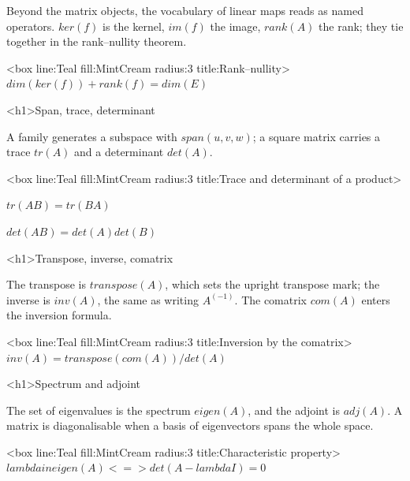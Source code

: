 \documentclass[
  margins=18,
  font=Latin Modern Roman,
  size=12,
  linespread=1.4,
  lang=en
]{scholatex}
\begin{document}
Beyond the matrix objects, the vocabulary of linear maps reads as named
operators. $ker(f)$ is the kernel, $im(f)$ the image, $rank(A)$ the rank;
they tie together in the rank–nullity theorem.

<box line:Teal fill:MintCream radius:3 title:{Rank–nullity}>{
	$dim(ker(f)) + rank(f) = dim(E)$
}

<h1>Span, trace, determinant

A family generates a subspace with $span(u, v, w)$; a square matrix carries
a trace $tr(A)$ and a determinant $det(A)$.

<box line:Teal fill:MintCream radius:3 title:{Trace and determinant of a product}>{
	$tr(A B) = tr(B A)$

	$det(A B) = det(A) det(B)$
}

<h1>Transpose, inverse, comatrix

The transpose is $transpose(A)$, which sets the upright transpose mark; the
inverse is $inv(A)$, the same as writing $A^(-1)$. The comatrix $com(A)$
enters the inversion formula.

<box line:Teal fill:MintCream radius:3 title:{Inversion by the comatrix}>{
	$inv(A) = transpose(com(A)) / det(A)$
}

<h1>Spectrum and adjoint

The set of eigenvalues is the spectrum $eigen(A)$, and the adjoint is
$adj(A)$. A matrix is diagonalisable when a basis of eigenvectors spans the
whole space.

<box line:Teal fill:MintCream radius:3 title:{Characteristic property}>{
	$lambda in eigen(A) <=> det(A - lambda I) = 0$
}
\end{document}

